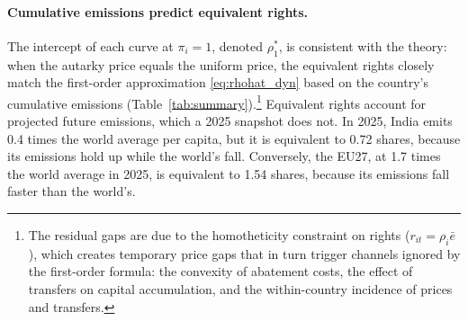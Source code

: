 \documentclass[12pt,english]{article}
\theoremstyle{remark}
\begin{document}
\paragraph{Cumulative emissions predict equivalent rights.} 
The intercept of each curve at $\pi_i=1$, denoted $\rho^*_1$, is consistent with the theory: when the autarky price equals the uniform price, the equivalent rights closely match the first-order approximation \eqref{eq:rhohat_dyn} based on the country's cumulative emissions (Table~\ref{tab:summary}).\footnote{The residual gaps are due to the homotheticity constraint on rights ($r_{it}=\rho_i \bar e$), which creates temporary price gaps that in turn trigger channels ignored by the first-order formula: the convexity of abatement costs, the effect of transfers on capital accumulation, and the within-country incidence of prices and transfers.} 
Equivalent rights account for projected future emissions, which a 2025 snapshot does not.
In 2025, India emits 0.4 times the world average per capita, but it is equivalent to 0.72 shares, because its emissions hold up while the world's fall. %
Conversely, the EU27, at 1.7 times the world average in 2025, is equivalent to 1.54 shares, because its emissions fall faster than the world's. %

\end{document}
